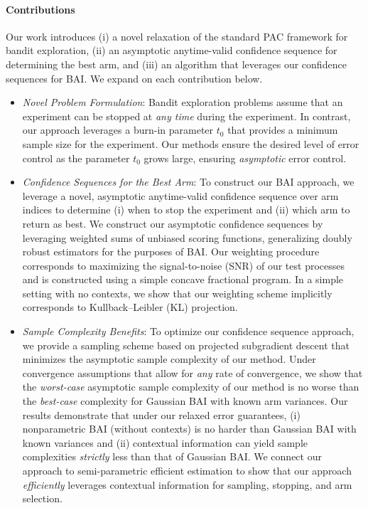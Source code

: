 \documentclass{article}
\begin{document}
\paragraph{Contributions} Our work introduces (i) a novel relaxation of the standard PAC framework for bandit exploration, (ii) an asymptotic anytime-valid confidence sequence for determining the best arm, and (iii) an algorithm that leverages our confidence sequences for BAI. We expand on each contribution below.

\begin{itemize}
    \item \textit{Novel Problem Formulation}: Bandit exploration problems assume that an experiment can be stopped at \textit{any time} during the experiment. In contrast, our approach leverages a burn-in parameter $t_0$ that provides a minimum sample size for the experiment. Our methods ensure the desired level of error control as the parameter $t_0$ grows large, ensuring \textit{asymptotic} error control. 

    \item \textit{Confidence Sequences for the Best Arm}: To construct our BAI approach, we leverage a novel, asymptotic anytime-valid confidence sequence over arm indices to determine (i) when to stop the experiment and (ii) which arm to return as best. We construct our asymptotic confidence sequences by leveraging weighted sums of unbiased scoring functions, generalizing doubly robust estimators for the purposes of BAI. Our weighting procedure corresponds to maximizing the signal-to-noise (SNR) of our test processes and is constructed using a simple concave fractional program. In a simple setting with no contexts, we show that our weighting scheme implicitly corresponds to Kullback–Leibler (KL) projection.
    
    \item \textit{Sample Complexity Benefits}: To optimize our confidence sequence approach, we provide a sampling scheme based on projected subgradient descent that minimizes the asymptotic sample complexity of our method. Under convergence assumptions that allow for \textit{any} rate of convergence, we show that the \textit{worst-case} asymptotic sample complexity of our method is no worse than the \textit{best-case} complexity for Gaussian BAI with known arm variances. Our results demonstrate that under our relaxed error guarantees, (i) nonparametric BAI (without contexts) is no harder than Gaussian BAI with known variances and (ii) contextual information can yield sample complexities \textit{strictly} less than that of Gaussian BAI. We connect our approach to semi-parametric efficient estimation to show that our approach \textit{efficiently} leverages contextual information for sampling, stopping, and arm selection.  
\end{itemize}
\end{document}
